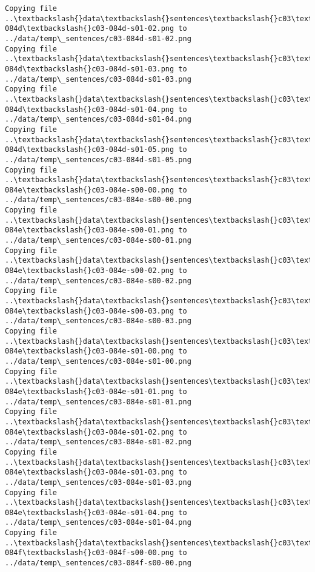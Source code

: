 \documentclass[11pt]{article}
\begin{document}
\begin{Verbatim}[commandchars=\\\{\}]
Copying file ..\textbackslash{}data\textbackslash{}sentences\textbackslash{}c03\textbackslash{}c03-084d\textbackslash{}c03-084d-s01-02.png to
../data/temp\_sentences/c03-084d-s01-02.png
Copying file ..\textbackslash{}data\textbackslash{}sentences\textbackslash{}c03\textbackslash{}c03-084d\textbackslash{}c03-084d-s01-03.png to
../data/temp\_sentences/c03-084d-s01-03.png
Copying file ..\textbackslash{}data\textbackslash{}sentences\textbackslash{}c03\textbackslash{}c03-084d\textbackslash{}c03-084d-s01-04.png to
../data/temp\_sentences/c03-084d-s01-04.png
Copying file ..\textbackslash{}data\textbackslash{}sentences\textbackslash{}c03\textbackslash{}c03-084d\textbackslash{}c03-084d-s01-05.png to
../data/temp\_sentences/c03-084d-s01-05.png
Copying file ..\textbackslash{}data\textbackslash{}sentences\textbackslash{}c03\textbackslash{}c03-084e\textbackslash{}c03-084e-s00-00.png to
../data/temp\_sentences/c03-084e-s00-00.png
Copying file ..\textbackslash{}data\textbackslash{}sentences\textbackslash{}c03\textbackslash{}c03-084e\textbackslash{}c03-084e-s00-01.png to
../data/temp\_sentences/c03-084e-s00-01.png
Copying file ..\textbackslash{}data\textbackslash{}sentences\textbackslash{}c03\textbackslash{}c03-084e\textbackslash{}c03-084e-s00-02.png to
../data/temp\_sentences/c03-084e-s00-02.png
Copying file ..\textbackslash{}data\textbackslash{}sentences\textbackslash{}c03\textbackslash{}c03-084e\textbackslash{}c03-084e-s00-03.png to
../data/temp\_sentences/c03-084e-s00-03.png
Copying file ..\textbackslash{}data\textbackslash{}sentences\textbackslash{}c03\textbackslash{}c03-084e\textbackslash{}c03-084e-s01-00.png to
../data/temp\_sentences/c03-084e-s01-00.png
Copying file ..\textbackslash{}data\textbackslash{}sentences\textbackslash{}c03\textbackslash{}c03-084e\textbackslash{}c03-084e-s01-01.png to
../data/temp\_sentences/c03-084e-s01-01.png
Copying file ..\textbackslash{}data\textbackslash{}sentences\textbackslash{}c03\textbackslash{}c03-084e\textbackslash{}c03-084e-s01-02.png to
../data/temp\_sentences/c03-084e-s01-02.png
Copying file ..\textbackslash{}data\textbackslash{}sentences\textbackslash{}c03\textbackslash{}c03-084e\textbackslash{}c03-084e-s01-03.png to
../data/temp\_sentences/c03-084e-s01-03.png
Copying file ..\textbackslash{}data\textbackslash{}sentences\textbackslash{}c03\textbackslash{}c03-084e\textbackslash{}c03-084e-s01-04.png to
../data/temp\_sentences/c03-084e-s01-04.png
Copying file ..\textbackslash{}data\textbackslash{}sentences\textbackslash{}c03\textbackslash{}c03-084f\textbackslash{}c03-084f-s00-00.png to
../data/temp\_sentences/c03-084f-s00-00.png

\end{Verbatim}
\end{document}

